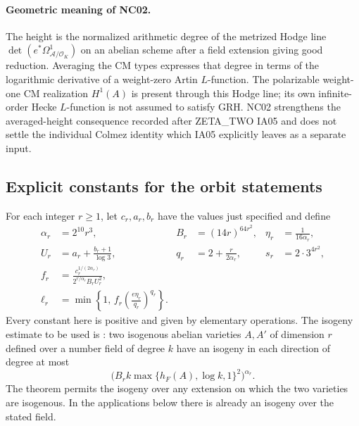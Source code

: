 \paragraph{Geometric meaning of NC02.}
The height is the normalized arithmetic degree of the metrized Hodge
line $\det(e^*\Omega^1_{\mathcal A/\mathcal O_K})$ on an abelian
scheme after a field extension giving good reduction.
Averaging the CM types expresses that degree in terms of the logarithmic
derivative of a weight-zero Artin $L$-function.  The polarizable
weight-one CM realization $H^1(A)$ is present through this Hodge line;
its own infinite-order Hecke $L$-function is not assumed to satisfy GRH.
NC02 strengthens the averaged-height consequence recorded after
ZETA\_TWO IA05 and does not settle the individual Colmez identity
which IA05 explicitly leaves as a separate input.

\subsection{Explicit constants for the orbit statements}

For each integer $r\geq1$, let $c_r,a_r,b_r$ have the values just
specified and define
\begin{align*}
 \alpha_r&=2^{10}r^3,& B_r&=(14r)^{64r^2},&
 \eta_r&=\frac{1}{16\alpha_r},\\
 U_r&=a_r+\frac{b_r+1}{\log3},&
 q_r&=2+\frac{r}{2\alpha_r},&
 s_r&=2\cdot3^{4r^2},\\
 f_r&=\frac{c_r^{1/(2\alpha_r)}}
              {2^{r/\alpha_r}B_rU_r^2},&&&\\
 \ell_r&=\min\left\{1,\,
           f_r\left(\frac{e\eta_r}{q_r}\right)^{q_r}\right\}.&&&
\end{align*}
Every constant here is positive and given by elementary operations.
The isogeny estimate to be used is
\cite[Theorem~1.4, p.~2060; definition of $\kappa(A)$, p.~2058]
{NC-GRPol2014}: two isogenous abelian varieties $A,A'$ of dimension $r$
defined over a number field of degree $k$ have an isogeny in each
direction of degree at most
\begin{equation}\label{eq:NC-GR}
 \bigl(B_rk\max\{h_F(A),\log k,1\}^{2}\bigr)^{\alpha_r}.
\end{equation}
The theorem permits the isogeny over any extension on which the two
varieties are isogenous.  In the applications below there is already
an isogeny over the stated field.

